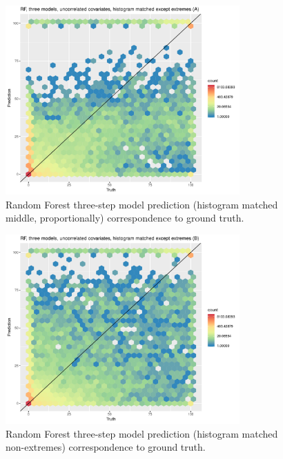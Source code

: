 \documentclass[a4paper,10pt]{article}
\begin{document}
\begin{figure}
    \includegraphics[width=0.8\textwidth]{article-figures/hexplots/2019-03-22-rf-3m-uncor-hma-hex}
    \caption{Random Forest three-step model prediction (histogram matched middle, proportionally) correspondence to ground truth.}
    \label{hex-rf-3m-uncor-hma}
\end{figure}
\begin{figure}
    \includegraphics[width=0.8\textwidth]{article-figures/hexplots/2019-03-22-rf-3m-uncor-hmb-hex}
    \caption{Random Forest three-step model prediction (histogram matched non-extremes) correspondence to ground truth.}
    \label{hex-rf-3m-uncor-hmb}
\end{figure}
\end{document}
